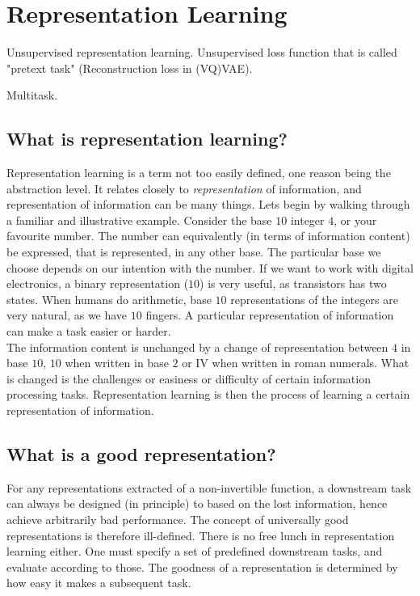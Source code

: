 \documentclass[../../thesis.tex]{subfiles}
\begin{document}
\section{Representation Learning}

Unsupervised representation learning. Unsupervised loss function that is called "pretext task" (Reconstruction loss in (VQ)VAE).  

Multitask.
\cite{Rep-rev-persp}

\subsection{What is representation learning?}
Representation learning is a term not too easily defined, one reason being the abstraction level. It relates closely to \textit{representation} of information, and representation of information can be many things. Lets begin by walking through a familiar and illustrative example. Consider the base $10$ integer $4$, or your favourite number. The number can equivalently (in terms of information content) be expressed, that is represented, in any other base. The particular base we choose depends on our intention with the number. If we want to work with digital electronics, a binary representation ($10$) is very useful, as transistors has two states. When humans do arithmetic, base $10$ representations of the integers are very natural, as we have $10$ fingers. A particular representation of information can make a task easier or harder.
\\ The information content is unchanged by a change of representation between $4$ in base $10$, $10$ when written in base $2$ or \RN{4} when written in roman numerals. What is changed is the challenges or easiness or difficulty of certain information processing tasks. Representation learning is then the process of learning a certain representation of information. 

\subsection{What is a good representation?}

For any representations extracted of a non-invertible function, a downstream task can always be designed (in principle) to based on the lost information, hence achieve arbitrarily bad performance. The concept of universally good representations is therefore ill-defined. There is no free lunch in representation learning either. One must specify a set of predefined downstream tasks, and evaluate according to those. The goodness of a representation is determined by how easy it makes a subsequent task.
\end{document}
